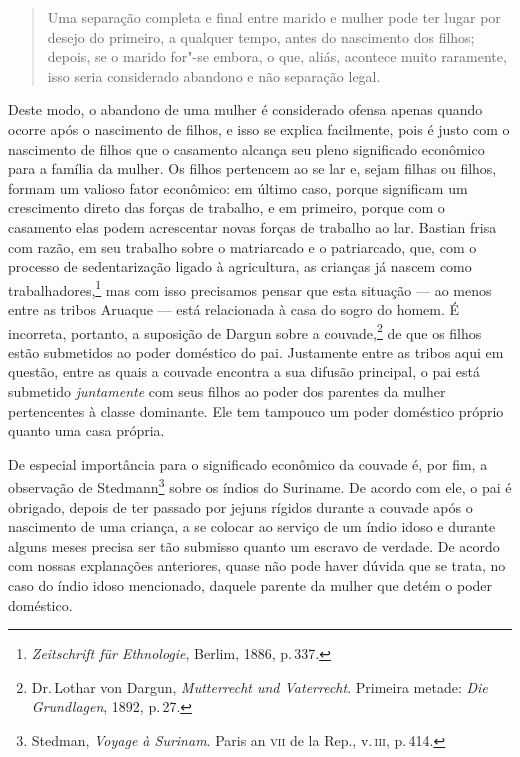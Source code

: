 \begin{quote}
Uma separação completa e
final entre marido e mulher pode ter lugar por desejo do primeiro, a
qualquer tempo, antes do nascimento dos filhos; depois, se o marido
for"-se embora, o que, aliás, acontece muito raramente, isso seria
considerado abandono e não separação legal. 
\end{quote}

Deste modo, o abandono de uma mulher é considerado ofensa apenas quando ocorre após o
nascimento de filhos, e isso se explica facilmente, pois é justo com
o nascimento de filhos que o casamento alcança seu pleno significado
econômico para a família da mulher. Os filhos pertencem ao se lar e, 
sejam filhas ou filhos, formam um valioso fator econômico: em
último caso, porque significam um crescimento direto das forças de
trabalho, e em primeiro, porque com o casamento elas podem acrescentar
novas forças de trabalho ao lar. Bastian frisa com razão, em seu
trabalho sobre o matriarcado e o patriarcado, que, com o processo de
sedentarização ligado à agricultura, as crianças já nascem como
trabalhadores,\footnote{\textit{Zeitschrift für Ethnologie}, Berlim, 1886,
  p.\,337.} mas com isso precisamos pensar que esta situação --- ao menos entre as
tribos Aruaque --- está relacionada à casa do sogro do homem. É
incorreta, portanto, a suposição de Dargun sobre a couvade,\footnote{Dr.\,Lothar von Dargun,
  \textit{Mutterrecht und Vaterrecht}. Primeira metade:
  \textit{Die Grundlagen}, 1892, p.\,27.} de que os filhos estão
submetidos ao poder doméstico do pai. Justamente entre as tribos aqui em
questão, entre as quais a couvade encontra a sua difusão principal, o
pai está submetido \textit{juntamente} com seus filhos ao poder dos parentes da
mulher pertencentes à classe dominante. Ele tem tampouco um poder
doméstico próprio quanto uma casa própria.

De especial importância para o significado econômico da couvade é, por
fim, a observação de Stedmann\footnote{Stedman, \textit{Voyage à Surinam}.
  Paris an \textsc{vii} de la Rep., v.\,\textsc{iii}, p.\,414.} sobre os índios do
Suriname. De acordo com ele, o pai é obrigado, depois de ter passado por
jejuns rígidos durante a couvade após o nascimento de uma criança, a se
colocar ao serviço de um índio idoso e durante alguns meses precisa ser
tão submisso quanto um escravo de verdade. De acordo com nossas
explanações anteriores, quase não pode haver dúvida que se trata, no
caso do índio idoso mencionado, daquele parente da mulher que detém o
poder doméstico.

